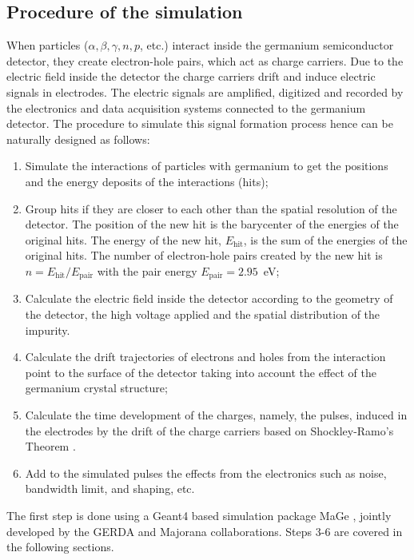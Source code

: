 \documentclass[epj]{svjour}
\begin{document}
\subsection{Procedure of the simulation}
\label{s:proc}
When particles ($\alpha, \beta, \gamma, n, p$, etc.) interact inside
the germanium semiconductor detector, they create electron-hole pairs,
which act as charge carriers. Due to the electric field inside the
detector the charge carriers drift and induce electric signals in
electrodes. The electric signals are amplified, digitized and recorded
by the electronics and data acquisition systems connected to the
germanium detector. The procedure to simulate this signal formation
process hence can be naturally designed as follows:
\begin{enumerate} 
\item Simulate the interactions of particles with germanium to get the
positions and the energy deposits of the interactions (hits);
\item Group hits if they are closer to each other than the spatial
resolution of the detector. The position of the new hit is the
barycenter of the energies of the original hits. The energy of the new
hit, $E_{\mbox{hit}}$, is the sum of the energies of the original
hits. The number of electron-hole pairs created by the new hit is $n =
E_{\mbox{hit}} / E_{\mbox{pair}}$ with the pair energy
$E_{\mbox{pair}} = 2.95$~eV;
\item Calculate the electric field inside the detector according to
the geometry of the detector, the high voltage applied and the spatial
distribution of the impurity.
\item Calculate the drift trajectories of electrons and holes from the
interaction point to the surface of the detector taking into account
the effect of the germanium crystal structure;
\item Calculate the time development of the charges, namely, the
pulses, induced in the electrodes by the drift of the charge carriers
based on Shockley-Ramo's Theorem \cite{Gat82,Rad88,He00}.
\item Add to the simulated pulses the effects from the electronics
such as noise, bandwidth limit, and shaping, etc.
\end{enumerate} 
The first step is done using a Geant4 \cite{G403,G406} based
simulation package MaGe \cite{MaGe}, jointly developed by the GERDA
and Majorana collaborations. Steps 3-6 are covered in the following
sections.
\end{document}
